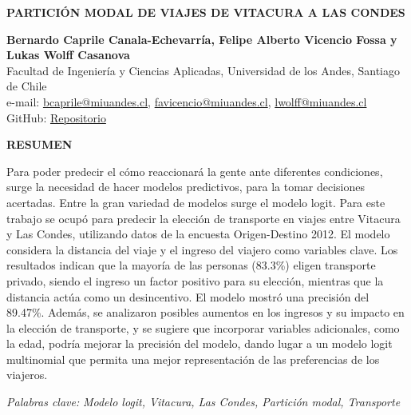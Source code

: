 \documentclass[letterpaper,12pt]{article}
\begin{document}
\begin{titlepage}
    \begin{center}
        
    
    \vspace*{1cm}


    \textbf{\Large PARTICIÓN MODAL DE VIAJES DE VITACURA A LAS CONDES}
  
    \vspace{1cm}
    
    \textbf{Bernardo Caprile Canala-Echevarría, Felipe Alberto Vicencio Fossa y Lukas Wolff Casanova}\\
    Facultad de Ingeniería y Ciencias Aplicadas, Universidad de los Andes, Santiago de Chile\\
    e-mail: \href{mailto:bcaprile@miuandes.cl}{bcaprile@miuandes.cl}, \href{mailto:favicencio@miuandes.cl}{favicencio@miuandes.cl}, \href{mailto:lwolff@miuandes.cl}{lwolff@miuandes.cl}\\
    GitHub: \href{https://github.com/LukasWolff2002/TAREA_4_AUTITOS}{Repositorio}
    \vspace{2cm}
    
    \textbf{RESUMEN}
    \end{center}
    \vspace{0.5cm}
    
    Para poder predecir el cómo reaccionará la gente ante diferentes condiciones, surge la necesidad de hacer modelos predictivos, para la tomar decisiones acertadas. Entre la gran variedad de modelos surge el modelo logit. Para este trabajo se ocupó para predecir la elección de transporte en viajes entre Vitacura y Las Condes, utilizando datos de la encuesta Origen-Destino 2012. El modelo considera la distancia del viaje y el ingreso del viajero como variables clave. Los resultados indican que la mayoría de las personas (83.3\%) eligen transporte privado, siendo el ingreso un factor positivo para su elección, mientras que la distancia actúa como un desincentivo. El modelo mostró una precisión del 89.47\%. Además, se analizaron posibles aumentos en los ingresos y su impacto en la elección de transporte, y se sugiere que incorporar variables adicionales, como la edad, podría mejorar la precisión del modelo, dando lugar a un modelo logit multinomial que permita una mejor representación de las preferencias de los viajeros.


    \vspace{1cm}
    
    \textit{Palabras clave:} \textit{Modelo logit, Vitacura, Las Condes, Partición modal, Transporte}
    
\end{titlepage}

\newpage








\end{document}
